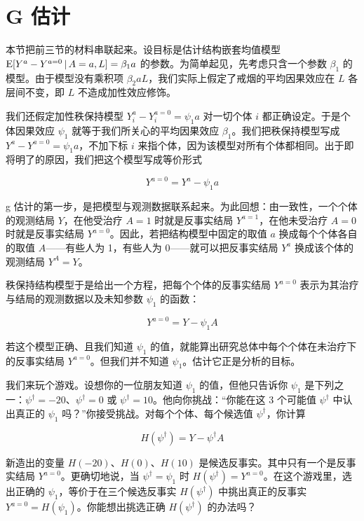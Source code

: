 
\section{G 估计}

本节把前三节的材料串联起来。设目标是估计结构嵌套均值模型 $\mathrm{E}[Y^a-Y^{a=0}\,|\, A=a,L]=\beta_1a$ 的参数。为简单起见，先考虑只含一个参数 $\beta_1$ 的模型。由于模型没有乘积项 $\beta_2aL$，我们实际上假定了戒烟的平均因果效应在 $L$ 各层间不变，即 $L$ 不造成加性效应修饰。

我们还假定加性秩保持模型 $Y_i^a-Y_i^{a=0}=\psi_1a$ 对一切个体 $i$ 都正确设定。于是个体因果效应 $\psi_1$ 就等于我们所关心的平均因果效应 $\beta_1$。我们把秩保持模型写成 $Y^a-Y^{a=0}=\psi_1a$，不加下标 $i$ 来指个体，因为该模型对所有个体都相同。出于即将明了的原因，我们把这个模型写成等价形式

\[
Y^{a=0}=Y^a-\psi_1a
\]

g 估计的第一步，是把模型与观测数据联系起来。为此回想：由一致性，一个个体的观测结局 $Y$，在他受治疗 $A=1$ 时就是反事实结局 $Y^{a=1}$，在他未受治疗 $A=0$ 时就是反事实结局 $Y^{a=0}$。因此，若把结构模型中固定的取值 $a$ 换成每个个体各自的取值 $A$——有些人为 1，有些人为 0——就可以把反事实结局 $Y^a$ 换成该个体的观测结局 $Y^A=Y$。

秩保持结构模型于是给出一个方程，把每个个体的反事实结局 $Y^{a=0}$ 表示为其治疗与结局的观测数据以及未知参数 $\psi_1$ 的函数：

\[
Y^{a=0}=Y-\psi_1A
\]

若这个模型正确、且我们知道 $\psi_1$ 的值，就能算出研究总体中每个个体在未治疗下的反事实结局 $Y^{a=0}$。但我们并不知道 $\psi_1$。估计它正是分析的目标。

我们来玩个游戏。设想你的一位朋友知道 $\psi_1$ 的值，但他只告诉你 $\psi_1$ 是下列之一：$\psi^\dagger=-20$、$\psi^\dagger=0$ 或 $\psi^\dagger=10$。他向你挑战：“你能在这 3 个可能值 $\psi^\dagger$ 中认出真正的 $\psi_1$ 吗？”你接受挑战。对每个个体、每个候选值 $\psi^\dagger$，你计算

\[
H(\psi^\dagger)=Y-\psi^\dagger A
\]

新造出的变量 $H(-20)$、$H(0)$、$H(10)$ 是候选反事实。其中只有一个是反事实结局 $Y^{a=0}$。更确切地说，当 $\psi^\dagger=\psi_1$ 时 $H(\psi^\dagger)=Y^{a=0}$。在这个游戏里，选出正确的 $\psi_1$，等价于在三个候选反事实 $H(\psi^\dagger)$ 中挑出真正的反事实 $Y^{a=0}=H(\psi_1)$。你能想出挑选正确 $H(\psi^\dagger)$ 的办法吗？

